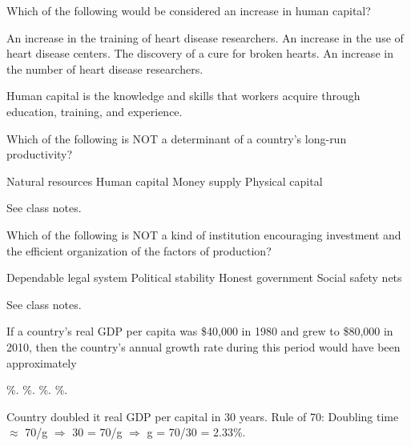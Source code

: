 \documentclass[addpoints,11pt]{exam}
\theoremstyle{definition}
\begin{document}
\begin{questions}
	
	\question Which of the following would be considered an increase in human capital?
	
	\begin{choices}
		\CorrectChoice An increase in the training of heart disease researchers.
		\choice An increase in the use of heart disease centers.
		\choice The discovery of a cure for broken hearts.
		\choice An increase in the number of heart disease researchers.
	\end{choices}
	
	\begin{solution}
		Human capital is the knowledge and skills that workers acquire through education, training, and experience.
	\end{solution}
	
	\question Which of the following is NOT a determinant of a country's long-run productivity?
	
	\begin{choices}
		\choice Natural resources
		\choice Human capital
		\CorrectChoice Money supply
		\choice Physical capital
	\end{choices}
	
	\begin{solution}
		See class notes.
	\end{solution}
	
	
	\question Which of the following is NOT a kind of institution encouraging investment and the efficient organization of the factors of production?
	
	\begin{choices}
		\choice Dependable legal system
		\choice Political stability
		\choice Honest government
		\CorrectChoice Social safety nets
	\end{choices}
	
	\begin{solution}
		See class notes.
	\end{solution}
	
	\question If a country's real GDP per capita was \$40,000 in 1980 and grew to \$80,000 in 2010, then the country's annual growth rate during this period would have been approximately 
	
	\begin{choices}
		\CorrectChoice 2.3\%.
		\choice 50\%.
		\choice 3\%.
		\choice 100\%.
	\end{choices}
	
	\begin{solution}
		Country doubled it real GDP per capital in 30 years. Rule of 70: Doubling time $\approx$ 70/g $\Rightarrow$ 30 = 70/g $\Rightarrow$ g = 70/30 = 2.33\%.
	\end{solution}
	

\end{questions}
\end{document}
